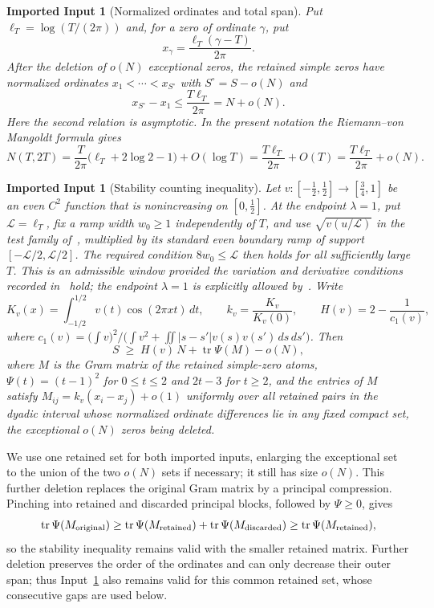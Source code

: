 \documentclass[11pt]{article}
\newtheorem{impinput}[theorem]{Imported Input}
\DeclareMathOperator{\tr}{tr}
\begin{document}
\begin{impinput}[Normalized ordinates and total span]\label{inp:span}
Put $\ell_T=\log(T/(2\pi))$ and, for a zero of ordinate $\gamma$, put
\[
 x_\gamma=\frac{\ell_T(\gamma-T)}{2\pi}.
\]
After the deletion of $o(N)$ exceptional zeros, the retained simple zeros
have normalized ordinates $x_1<\cdots<x_{S^\circ}$ with
$S^\circ=S-o(N)$ and
\begin{equation}\label{eq:totalspan}
 x_{S^\circ}-x_1\le\frac{T\ell_T}{2\pi}=N+o(N).
\end{equation}
Here the second relation is asymptotic.  In the present notation the
Riemann--von Mangoldt formula gives
\[
 N(T,2T)=\frac{T}{2\pi}\bigl(\ell_T+2\log2-1\bigr)+O(\log T)
 =\frac{T\ell_T}{2\pi}+O(T)
 =\frac{T\ell_T}{2\pi}+o(N).
\]
\end{impinput}

\begin{impinput}[Stability counting inequality]\label{inp:stability}
Let $v:[-\tfrac12,\tfrac12]\to[\tfrac34,1]$ be an even $C^2$ function that
is nonincreasing on $[0,\tfrac12]$.  At the endpoint $\lambda=1$, put
$\mathcal L=\ell_T$, fix a ramp width $w_0\ge1$ independently of $T$, and use
$\sqrt{v(u/\mathcal L)}$ in the test family of~\cite[\S2]{Claude26},
multiplied by its standard even boundary ramp of support
$[-\mathcal L/2,\mathcal L/2]$.  The required condition
$8w_0\le\mathcal L$ then holds for all sufficiently large $T$.  This is an
admissible window provided the variation and derivative conditions recorded
in~\cite[\S7.1]{Claude26} hold; the endpoint $\lambda=1$ is explicitly
allowed by~\cite[Remark~6.1]{Claude26}.  Write
\[
 K_v(x)=\int_{-1/2}^{1/2}v(t)\cos(2\pi xt)\,dt,\qquad
 k_v=\frac{K_v}{K_v(0)},\qquad
 H(v)=2-\frac1{c_1(v)},
\]
where $c_1(v)=\bigl(\int v\bigr)^2/\bigl(\int v^2+\iint|s-s'|v(s)v(s')\,ds\,ds'\bigr)$.
Then
\begin{equation}\label{eq:stability}
 S\;\ge\;H(v)\,N+\tr\Psi(M)-o(N),
\end{equation}
where $M$ is the Gram matrix of the retained simple-zero atoms,
$\Psi(t)=(t-1)^2$ for $0\le t\le2$ and $2t-3$ for $t\ge2$, and the entries of
$M$ satisfy $M_{ij}=k_v(x_i-x_j)+o(1)$ uniformly over all retained pairs in
the dyadic interval whose normalized ordinate differences lie in any fixed
compact set, the exceptional $o(N)$ zeros being deleted.
\end{impinput}

We use one retained set for both imported inputs, enlarging the exceptional
set to the union of the two $o(N)$ sets if necessary; it still has size
$o(N)$.  This further deletion replaces the original Gram matrix by a
principal compression.  Pinching into retained and discarded principal
blocks, followed by $\Psi\ge0$, gives
\[
 \tr\Psi(M_{\rm original})
 \ge\tr\Psi(M_{\rm retained})+\tr\Psi(M_{\rm discarded})
 \ge\tr\Psi(M_{\rm retained}),
\]
so the stability inequality remains valid with the smaller retained matrix.
Further deletion preserves the order of the ordinates and can only decrease
their outer span; thus Input~\ref{inp:span} also remains valid for this common
retained set, whose consecutive gaps are used below.
\end{document}
